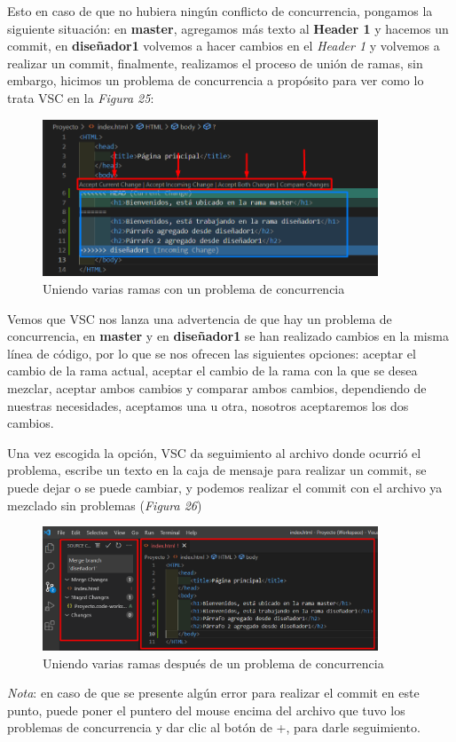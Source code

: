 Esto en caso de que no hubiera ningún conflicto de concurrencia, pongamos la siguiente situación: en \textbf{master}, agregamos más texto al \textbf{Header 1} y hacemos un commit, en \textbf{diseñador1} volvemos a hacer cambios en el \textit{Header 1} y volvemos a realizar un commit, finalmente, realizamos el proceso de unión de ramas, sin embargo, hicimos un problema de concurrencia a propósito para ver como lo trata VSC en la \textit{Figura 25}:
\begin{figure}[H]
    \begin{center}
        \caption{Uniendo varias ramas con un problema de concurrencia}
        \label{fig: 25}
        \includegraphics[width=10cm]{capturas/merge3.png}
    \end{center}
\end{figure}

Vemos que VSC nos lanza una advertencia de que hay un problema de concurrencia, en \textbf{master} y en \textbf{diseñador1} se han realizado cambios en la misma línea de código, por lo que se nos ofrecen las siguientes opciones: aceptar el cambio de la rama actual, aceptar el cambio de la rama con la que se desea mezclar, aceptar ambos cambios y comparar ambos cambios, dependiendo de nuestras necesidades, aceptamos una u otra, nosotros aceptaremos los dos cambios.

Una vez escogida la opción, VSC da seguimiento al archivo donde ocurrió el problema, escribe un texto en la caja de mensaje para realizar un commit, se puede dejar o se puede cambiar, y podemos realizar el commit con el archivo ya mezclado sin problemas (\textit{Figura 26})
\begin{figure}[H]
    \begin{center}
        \caption{Uniendo varias ramas después de un problema de concurrencia}
        \label{fig: 26}
        \includegraphics[width=10cm]{capturas/merge4.png}
    \end{center}
\end{figure}
\textit{Nota}: en caso de que se presente algún error para realizar el commit en este punto, puede poner el puntero del mouse encima del archivo que tuvo los problemas de concurrencia y dar clic al botón de +, para darle seguimiento.



